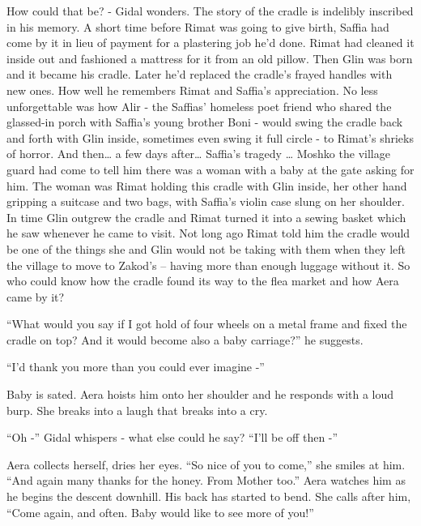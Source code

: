 \documentclass[twoside,11pt]{book}
\begin{document}
How could that be? - Gidal wonders. The story of the cradle is indelibly inscribed in his memory. A short time before
Rimat was going to give birth, Saffia had come by it in lieu of payment for a plastering
job he'd done. Rimat had cleaned it inside out and fashioned a mattress for
it from an old pillow. Then Glin was born and it became his cradle. Later he'd replaced the cradle's frayed handles
with new ones. How well he remembers Rimat and Saffia's appreciation. No less unforgettable was how Alir - the Saffias'
homeless poet friend who shared the glassed-in porch with Saffia's young brother Boni - would swing the cradle back and
forth with Glin inside, sometimes even swing it full circle - to Rimat's shrieks of horror. And then{\dots} a few days
after{\dots} Saffia's tragedy {\dots} Moshko the village guard had come to tell him there was a woman with a baby at
the gate asking for him. The woman was Rimat holding this cradle with Glin inside, her other hand gripping a suitcase
and two bags, with Saffia's violin case slung on her shoulder. In time Glin
outgrew the cradle and Rimat turned it into a sewing basket which he saw whenever he came to visit. Not long ago Rimat
told him the cradle would be one of the things she and Glin would not be taking with them when they left the village to
move to Zakod's -- having more than enough luggage without it. So who could
know how the cradle found its way to the flea market and how Aera came by it?

``What would you say if I got hold of four wheels on a metal frame and fixed the cradle on top? And it
would become also a baby carriage?'' he suggests.

``I'd thank you more than you could ever imagine -''

Baby is sated. Aera hoists him onto her shoulder and he responds with a loud burp. She breaks into a laugh that breaks
into a cry.

``Oh -'' Gidal whispers - what else could he say? ``I'll be off then
-''

Aera collects herself, dries her eyes. ``So nice of you to come,'' she smiles at him.
``And again many thanks for the honey. From Mother too.'' Aera watches him as he begins the
descent downhill. His back has started to bend. She calls after him, ``Come again, and often. Baby would
like to see more of you!''


\bigskip

\chapter{}
\end{document}
